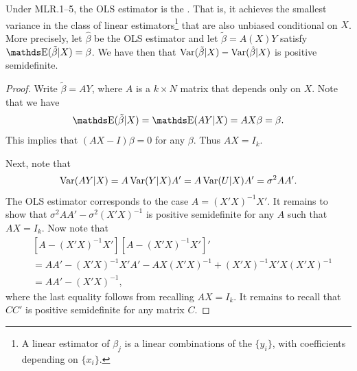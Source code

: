 \documentclass[letterpaper, 10pt]{article}
\begin{document}
\begin{theorem}
  Under MLR.1--5, the OLS estimator is the .
  That is, it achieves the smallest variance in the class of linear estimators\footnote{A linear estimator of \(\beta_j\) is a linear combinations of the \(\{y_i\}\), with coefficients depending on \(\{x_i\}\).} that are also unbiased conditional on \(X\).
  More precisely, let \(\hat{\beta}\) be the OLS estimator and let \(\tilde{\beta} = A(X) Y\) satisfy \(\E(\tilde{\beta} | X) = \beta\).
  We have then that \(\operatorname{Var}(\tilde{\beta} | X) - \operatorname{Var}(\hat{\beta} | X)\) is positive semidefinite.
\end{theorem}
\begin{proof}
  Write \(\tilde{\beta} = AY\), where \(A\) is a \(k \times N\) matrix that depends only on \(X\).
  Note that we have
  \[
    \E(\tilde{\beta}|X)
    = \E(AY|X)
    = AX \beta
    = \beta.
  \]
  This implies that \((AX - I)\beta = 0\) for any \(\beta\).
  Thus \(AX = I_k\).

  Next, note that
  \[
    \operatorname{Var}(AY|X)
    = A \operatorname{Var}(Y|X) A'
    = A \operatorname{Var}(U|X) A'
    = \sigma^2 A A'.
  \]
  The OLS estimator corresponds to the case \(A = (X' X)^{-1} X'\).
  It remains to show that \(\sigma^2 A A' - \sigma^2 (X' X)^{-1}\) is positive semidefinite for any \(A\) such that \(AX = I_k\).
  Now note that
  \begin{align*}
    &[A - (X' X)^{-1} X'] [A - (X' X)^{-1} X']' \\
    &= A A' - (X' X)^{-1} X' A' - A X (X' X)^{-1} + (X' X)^{-1} X' X(X'X)^{-1} \\
    &= A A' - (X' X)^{-1},
  \end{align*}
  where the last equality follows from recalling \(AX = I_k\).
  It remains to recall that \(CC'\) is positive semidefinite for any matrix \(C\).
\end{proof}
\end{document}
